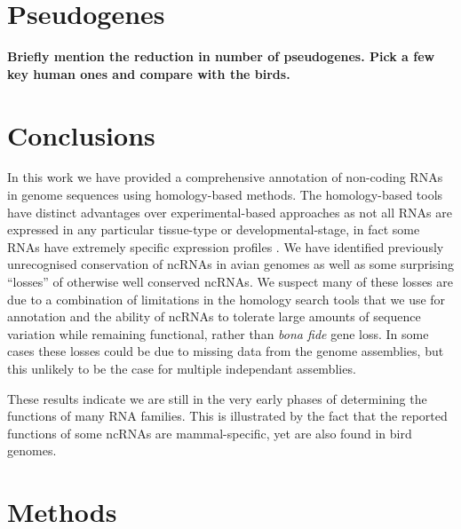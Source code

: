 \documentclass[10pt]{bmc_article}
\newenvironment{bmcformat}{\begin{raggedright}\baselineskip20pt\sloppy\setboolean{publ}{false}}{\end{raggedright}\baselineskip20pt\sloppy}
\begin{document}
\begin{bmcformat}
\section*{Pseudogenes}

{\bf Briefly mention the reduction in number of pseudogenes. Pick a
  few key human ones and compare with the birds. }

\section*{Conclusions}


In this work we have provided a comprehensive annotation of non-coding
RNAs in genome sequences using homology-based methods. The
homology-based tools have distinct advantages over experimental-based
approaches as not all RNAs are expressed in any particular tissue-type
or developmental-stage, in fact some RNAs have extremely specific
expression profiles \cite{Johnston:2003}.  We have identified
previously unrecognised conservation of ncRNAs in avian genomes as
well as some surprising ``losses'' of otherwise well conserved
ncRNAs. We suspect many of these losses are due to a combination of
limitations in the homology search tools that we use for annotation
and the ability of ncRNAs to tolerate large amounts of sequence
variation while remaining functional, rather than \emph{bona fide}
gene loss. In some cases these losses could be due to missing data
from the genome assemblies, but this unlikely to be the case for
multiple independant assemblies.

These results indicate we are still in the very early phases of
determining the functions of many RNA families. This is illustrated by
the fact that the reported functions of some ncRNAs are
mammal-specific, yet are also found in bird genomes.

\section*{Methods}


\end{bmcformat}
\end{document}
